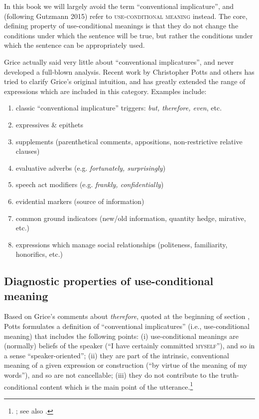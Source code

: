 In this book we will largely avoid the term “conventional implicature”, and (following Gutzmann 2015) refer to \textsc{use-conditional meaning} instead. The core, defining property of use-conditional meanings is that they do not change the conditions under which the sentence will be true, but rather the conditions under which the sentence can be appropriately used.



Grice actually said very little about “conventional implicatures”, and never developed a full-blown analysis. Recent work by Christopher Potts and others has tried to clarify Grice’s original intuition, and has greatly extended the range of expressions which are included in this category. Examples include:


\begin{enumerate}[label=\alph*.]
\item classic “conventional implicature” triggers: \textit{but, therefore, even}, etc. 
\item expressives \& epithets
\item supplements (parenthetical comments, appositions, non-restrictive relative clauses)
\item evaluative adverbs (e.g. \textit{fortunately, surprisingly})
\item speech act modifiers (e.g. \textit{frankly, confidentially})
\item evidential markers (source of information)
\item common ground indicators (new/old information, quantity hedge, mirative, etc.)
\item expressions which manage social relationships (politeness, familiarity, honorifics, etc.)

\end{enumerate}

\subsection{Diagnostic properties of use-conditional meaning}\label{sec:11.2.1}


Based on Grice’s comments about \textit{therefore}, quoted at the beginning of section , Potts formulates a definition of “conventional implicatures” (i.e., use-conditional meaning) that includes the following points: (i) use-conditional meanings are (normally) beliefs of the speaker (“I have certainly committed \textsc{myself}”), and so in a sense “speaker-oriented”; (ii) they are part of the intrinsic, conventional meaning of a given expression or construction (“by virtue of the meaning of my words”), and so are not cancellable; (iii) they do not contribute to the truth-conditional content which is the main point of the utterance.\footnote{\citet{Potts2005,Potts2012}; see also \citet[39]{Horn1997}.}



